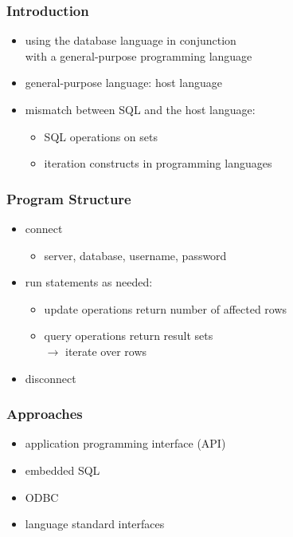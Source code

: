 \documentclass[dvipsnames]{beamer}
\theoremstyle{plain}
\begin{document}
\begin{frame}
  \frametitle{Introduction}

  \begin{itemize}
    \item using the database language in conjunction\\
      with a general-purpose programming language
    \item general-purpose language: \alert{host language}

    \pause
    \bigskip
    \item mismatch between SQL and the host language:
    \begin{itemize}
      \item SQL operations on sets
      \item iteration constructs in programming languages
    \end{itemize}
  \end{itemize}
\end{frame}

\begin{frame}
  \frametitle{Program Structure}

  \begin{itemize}
    \item connect
    \begin{itemize}
      \item server, database, username, password
    \end{itemize}

    \pause
    \medskip
    \item run statements as needed:
    \begin{itemize}
      \item update operations return number of affected rows
      \item query operations return result sets\\
        $\rightarrow$ iterate over rows
    \end{itemize}

    \pause
    \medskip
    \item disconnect
  \end{itemize}
\end{frame}

\begin{frame}
  \frametitle{Approaches}

  \begin{itemize}
    \item application programming interface (API)
    \item embedded SQL
    \item ODBC
    \item language standard interfaces
  \end{itemize}
\end{frame}
\end{document}
